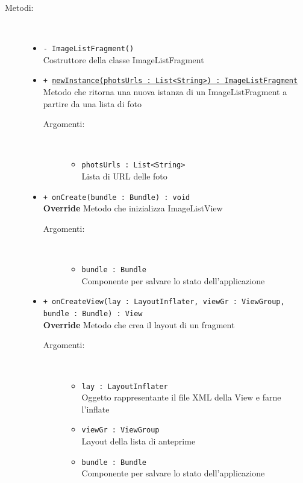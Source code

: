 \documentclass[../DefinizioneDiProdotto.tex]{subfiles}
\begin{document}
\begin{description}
\begin{itemize}
	\end{itemize}
	\item[Metodi:] \
	\begin{itemize}
		\item \texttt{- ImageListFragment()}\\
		Costruttore della classe ImageListFragment
		\item \texttt{+ \underline{newInstance(photsUrls : List<String>) : ImageListFragment}}\\
		Metodo che ritorna una nuova istanza di un ImageListFragment a partire da una lista di foto
		\begin{description}
			\item[Argomenti:] \
			\begin{itemize}
				\item \texttt{photsUrls : List<String>}\\
				Lista di URL delle foto\end{itemize}
		\end{description}
		\item \texttt{+ onCreate(bundle : Bundle) : void}\\
		\textbf{Override} Metodo che inizializza ImageListView
		\begin{description}
			\item[Argomenti:] \
			\begin{itemize}
				\item \texttt{bundle : Bundle}\\
				Componente per salvare lo stato dell'applicazione\end{itemize}
		\end{description}
		\item \texttt{+ onCreateView(lay : LayoutInflater, viewGr : ViewGroup, bundle : Bundle) : View}\\
		\textbf{Override} Metodo che crea il layout di un fragment
		\begin{description}
			\item[Argomenti:] \
			\begin{itemize}
				\item \texttt{lay : LayoutInflater}\\
				Oggetto rappresentante il file XML della View e farne l'inflate\item \texttt{viewGr : ViewGroup}\\
				Layout della lista di anteprime\item \texttt{bundle : Bundle}\\
				Componente per salvare lo stato dell'applicazione\end{itemize}

\end{description}
\end{itemize}
\end{description}
\end{document}
